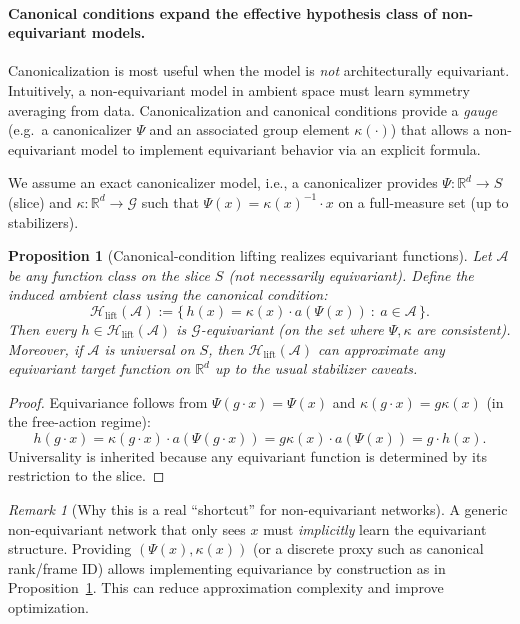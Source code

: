 \documentclass{article}
\theoremstyle{plain}
\newtheorem{proposition}[theorem]{Proposition}
\theoremstyle{definition}
\theoremstyle{remark}
\newtheorem{remark}[theorem]{Remark}
\newcommand{\1}{\mathbf{1}}
\begin{document}
\paragraph{Canonical conditions expand the effective hypothesis class of non-equivariant models.}
\label{para:noneq-gain}

Canonicalization is most useful when the model is \emph{not} architecturally equivariant.
Intuitively, a non-equivariant model in ambient space must learn symmetry averaging from data.
Canonicalization and canonical conditions provide a \emph{gauge} (e.g.\ a canonicalizer $\Psi$ and an associated group element $\kappa(\cdot)$) that allows a non-equivariant model to implement equivariant behavior via an explicit formula.

We assume an exact canonicalizer model, i.e., a canonicalizer provides $\Psi:\mathbb R^d\to S$ (slice) and $\kappa:\mathbb R^d\to\mathcal G$ such that
$\Psi(x)=\kappa(x)^{-1}\cdot x$ on a full-measure set (up to stabilizers).

\begin{proposition}[Canonical-condition lifting realizes equivariant functions]
\label{prop:canon-lift-class}
Let $\mathcal A$ be any function class on the slice $S$ (not necessarily equivariant). Define the induced ambient class using the canonical condition:
\begin{equation}
\mathcal H_{\mathrm{lift}}(\mathcal A):=
\big\{\, h(x)=\kappa(x)\cdot a(\Psi(x))\ :\ a\in\mathcal A \,\big\}.
\end{equation}
Then every $h\in \mathcal H_{\mathrm{lift}}(\mathcal A)$ is $\mathcal G$-equivariant (on the set where $\Psi,\kappa$ are consistent).
Moreover, if $\mathcal A$ is universal on $S$, then $\mathcal H_{\mathrm{lift}}(\mathcal A)$ can approximate any equivariant target
function on $\mathbb R^d$ up to the usual stabilizer caveats.
\end{proposition}

\begin{proof}
Equivariance follows from $\Psi(g\cdot x)=\Psi(x)$ and $\kappa(g\cdot x)=g\kappa(x)$ (in the free-action regime):
\begin{equation}
h(g\cdot x)=\kappa(g\cdot x)\cdot a(\Psi(g\cdot x))=g\kappa(x)\cdot a(\Psi(x))=g\cdot h(x).
\end{equation}
Universality is inherited because any equivariant function is determined by its restriction to the slice.
\end{proof}

\begin{remark}[Why this is a real ``shortcut'' for non-equivariant networks]
A generic non-equivariant network that only sees $x$ must \emph{implicitly} learn the equivariant structure.
Providing $(\Psi(x),\kappa(x))$ (or a discrete proxy such as canonical rank/frame ID) allows implementing equivariance
by construction as in Proposition~\ref{prop:canon-lift-class}. This can reduce approximation complexity and improve optimization.
\end{remark}
\end{document}

